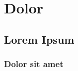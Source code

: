 \chapter{Dolor}\label{chap:dolor}

\lipsum[1]

\section{Lorem Ipsum}
\lipsum[2-4]

\subsection{Dolor sit amet}
\lipsum[5-11]